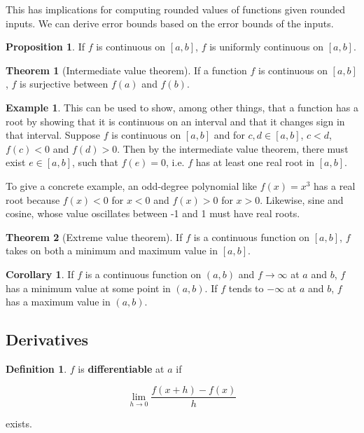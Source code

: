 \documentclass{article}
\theoremstyle{definition}
\newtheorem{definition}{Definition}[section]
\newtheorem{example}{Example}[section]
\newtheorem{proposition}{Proposition}[section]
\newtheorem{theorem}{Theorem}[section]
\newtheorem{corollary}{Corollary}[section]
\begin{document}
This has implications for computing rounded values of functions given rounded inputs. We can derive error bounds based on the error bounds of the inputs.

\begin{proposition}
If $f$  is continuous on $[a, b]$, $f$ is uniformly continuous on $[a, b]$.
\end{proposition}

\begin{theorem}[Intermediate value theorem]
If a function $f$ is continuous on $[a, b]$, $f$ is surjective between $f(a)$ and $f(b)$.
\end{theorem}

\begin{example}
This can be used to show, among other things, that a function has a root by showing that it is continuous on an interval and that it changes sign in that interval. Suppose $f$ is continuous on $[a, b]$ and for $c, d \in [a,b]$, $c < d$, $f(c) < 0$ and $f(d) > 0$. Then by the intermediate value theorem, there must exist $e \in [a,b]$, such that $f(e) = 0$, i.e. $f$ has at least one real root in $[a, b]$.

To give a concrete example, an odd-degree polynomial like $f(x) = x^3$ has a real root because $f(x) < 0$ for $x < 0$ and $f(x) > 0$ for $x > 0$. Likewise, sine and cosine, whose value oscillates between -1 and 1 must have real roots.
\end{example}

\begin{theorem}[Extreme value theorem]
If $f$ is a continuous function on $[a,b]$, $f$ takes on both a minimum and maximum value in $[a, b]$.
\end{theorem}

\begin{corollary}
If $f$ is a continuous function on $(a, b)$ and $f \to \infty$ at $a$ and $b$, $f$ has a minimum value at some point in $(a, b)$. If $f$ tends to $-\infty$ at $a$ and $b$, $f$ has a maximum value in $(a, b)$.
\end{corollary}

\subsection{Derivatives}

\begin{definition} 
$f$ is \textbf{differentiable} at $a$ if

\begin{equation*}
\lim_{h \to 0} \frac{f(x+h) - f(x)}{h}
\end{equation*}

exists.
\end{definition}
\end{document}
